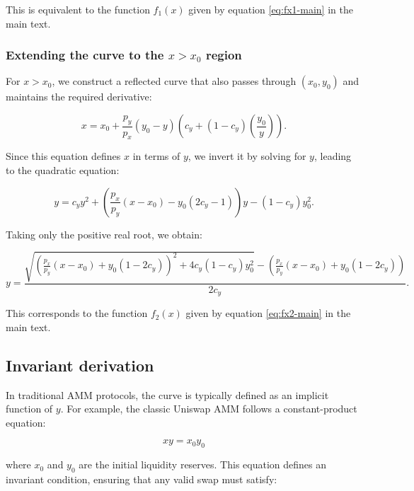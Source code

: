 \documentclass{article}
\begin{document}
This is equivalent to the function \( f_1(x) \) given by equation \eqref{eq:fx1-main} in the main text.

\subsubsection{Extending the curve to the \( x > x_0 \) region}

For \( x > x_0 \), we construct a reflected curve that also passes through \( (x_0, y_0) \) and maintains the required derivative:

\begin{equation}
    \label{eq:maglev-3-inverse}
    x = x_0 + \frac{p_y}{p_x} (y_0 - y) \left( c_y + (1 - c_y) \left(\frac{y_0}{y}\right) \right).
\end{equation}

Since this equation defines \( x \) in terms of \( y \), we invert it by solving for \( y \), leading to the quadratic equation:

\begin{equation}
    y = c_y y^2 + \left( \frac{p_x}{p_y} (x - x_0) - y_0(2c_y - 1) \right)y - (1 - c_y) y_0^2.
\end{equation}

Taking only the positive real root, we obtain:

\begin{equation}
    \label{eq:maglev-2}
    y = \frac{
        \sqrt{
            \left( \frac{p_x}{p_y} (x - x_0) + y_0 (1 - 2c_y) \right)^2 
            + 4c_y (1 - c_y) y_0^2
        } 
        - \left( \frac{p_x}{p_y} (x - x_0) + y_0 (1 - 2c_y) \right)
    }{2c_y}.
\end{equation}

This corresponds to the function \( f_2(x) \) given by equation \eqref{eq:fx2-main} in the main text.

\subsection{Invariant derivation}
\label{sec:invariant-derivation}

In traditional AMM protocols, the curve is typically defined as an implicit function of $y$. For example, the classic Uniswap AMM follows a constant-product equation:

\begin{equation}
    xy = x_0 y_0
\end{equation}

where $x_0$ and $y_0$ are the initial liquidity reserves. This equation defines an invariant condition, ensuring that any valid swap must satisfy:
\end{document}

